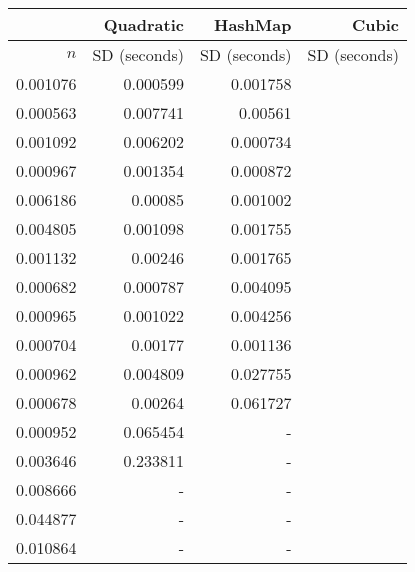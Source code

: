 \begin{tabular}{rrrr}
    &Quadratic & HashMap & Cubic\\\hline
    $n$ & SD (seconds) & SD (seconds) & SD (seconds) \\\hline
    0.001076	&	0.000599	&	0.001758	\\
0.000563	&	0.007741	&	0.00561	\\
0.001092	&	0.006202	&	0.000734	\\
0.000967	&	0.001354	&	0.000872	\\
0.006186	&	0.00085	&	0.001002	\\
0.004805	&	0.001098	&	0.001755	\\
0.001132	&	0.00246	&	0.001765	\\
0.000682	&	0.000787	&	0.004095	\\
0.000965	&	0.001022	&	0.004256	\\
0.000704	&	0.00177	&	0.001136	\\
0.000962	&	0.004809	&	0.027755	\\
0.000678	&	0.00264	&	0.061727	\\
0.000952	&	0.065454	&	-	\\
0.003646	&	0.233811	&	-	\\
0.008666	&	-	&	-	\\
0.044877	&	-	&	-	\\
0.010864	&	-	&	-	\\
\end{tabular}
    